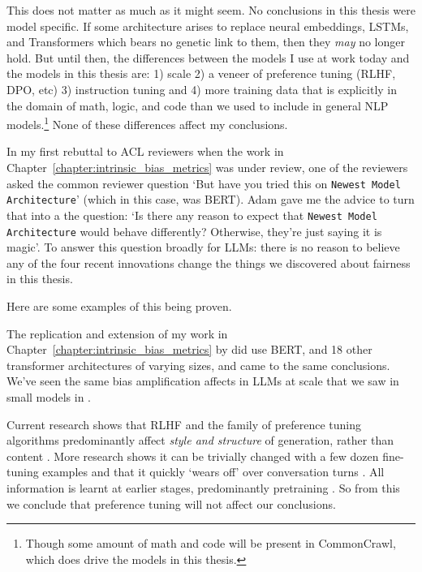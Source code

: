 This does not matter as much as it might seem. No conclusions in this thesis were model specific. If some architecture arises to replace neural embeddings, LSTMs, and Transformers which bears no genetic link to them, then they \textit{may} no longer hold. But until then, the differences between the models I use at work today and the models in this thesis are: 1) scale 2) a veneer of preference tuning (RLHF, DPO, etc) \citep{rafailov2024direct} 3) instruction tuning \citep{ouyang2022training} and 4) more training data that is explicitly in the domain of math, logic, and code than we used to include in general NLP models.\footnote{Though some amount of math and code will be present in CommonCrawl, which does drive the models in this thesis.} None of these differences affect my conclusions. 

In my first rebuttal to ACL reviewers when the work in Chapter~\ref{chapter:intrinsic_bias_metrics} was under review, one of the reviewers asked the common reviewer question `But have you tried this on {\tt Newest Model Architecture}' (which in this case, was BERT). Adam gave me the advice to turn that into a the question: `Is there any reason to expect that {\tt Newest Model Architecture} would behave differently? Otherwise, they're just saying it is magic'. To answer this question broadly for LLMs: there is no reason to believe any of the four recent innovations change the things we discovered about fairness in this thesis.

Here are some examples of this being proven. 

The replication and extension of my work in Chapter~\ref{chapter:intrinsic_bias_metrics} by \citet{cao-etal-2022-intrinsic} did use BERT, and 18 other transformer architectures of varying sizes, and came to the same conclusions. We've seen the same bias amplification affects in LLMs at scale \citep{bianchi-2023} that we saw in small models in \citet{zhao-etal-2017-men}. 

Current research shows that RLHF and the family of preference tuning algorithms predominantly affect \textit{style and structure} of generation, rather than content \citep{min-etal-2022-rethinking,  lin2023unlocking}. More research shows it can be trivially changed with a few dozen fine-tuning examples \citep{qi2023finetuning} and that it quickly `wears off' over conversation turns \citep{llama2}. All information is learnt at earlier stages, predominantly pretraining \citep{zhou2023lima}. So from this we conclude that preference tuning will not affect our conclusions. 


